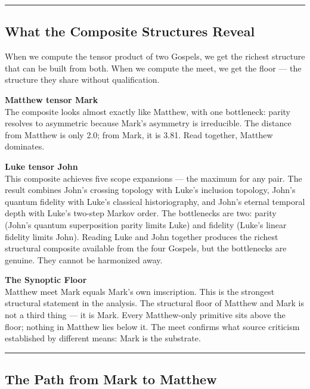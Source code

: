 \documentclass[12pt,a4paper]{article}
\begin{document}
\begin{center}
\rule{0.5\textwidth}{0.4pt}
\end{center}

\subsection{What the Composite Structures Reveal}

When we compute the tensor product of two Gospels, we get the richest structure that can be built from both. When we compute the meet, we get the floor --- the structure they share without qualification.

\textbf{Matthew tensor Mark} \\
The composite looks almost exactly like Matthew, with one bottleneck: parity resolves to asymmetric because Mark's asymmetry is irreducible. The distance from Matthew is only 2.0; from Mark, it is 3.81. Read together, Matthew dominates.

\textbf{Luke tensor John} \\
This composite achieves five scope expansions --- the maximum for any pair. The result combines John's crossing topology with Luke's inclusion topology, John's quantum fidelity with Luke's classical historiography, and John's eternal temporal depth with Luke's two-step Markov order. The bottlenecks are two: parity (John's quantum superposition parity limits Luke) and fidelity (Luke's linear fidelity limits John). Reading Luke and John together produces the richest structural composite available from the four Gospels, but the bottlenecks are genuine. They cannot be harmonized away.

\textbf{The Synoptic Floor} \\
Matthew meet Mark equals Mark's own imscription. This is the strongest structural statement in the analysis. The structural floor of Matthew and Mark is not a third thing --- it is Mark. Every Matthew-only primitive sits above the floor; nothing in Matthew lies below it. The meet confirms what source criticism established by different means: Mark is the substrate.

\begin{center}
\rule{0.5\textwidth}{0.4pt}
\end{center}

\subsection{The Path from Mark to Matthew}
\end{document}
